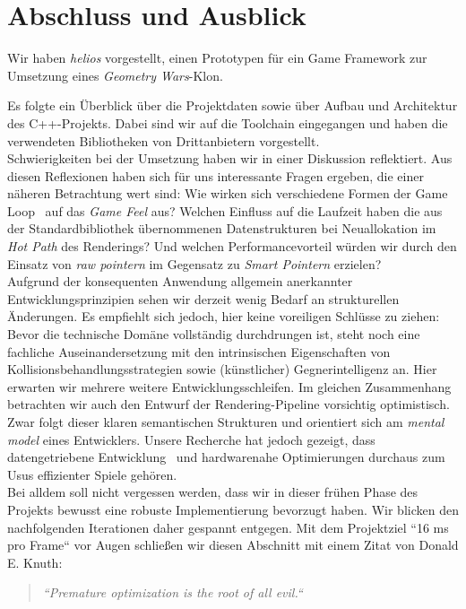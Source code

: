 \section{Abschluss und Ausblick}

Wir haben \textit{helios} vorgestellt, einen Prototypen für ein Game Framework zur Umsetzung eines \textit{Geometry Wars}-Klon.

Es folgte ein Überblick über die Projektdaten sowie über Aufbau und Architektur des C++-Projekts.
Dabei sind wir auf die Toolchain eingegangen und haben die verwendeten Bibliotheken von Drittanbietern vorgestellt.\\

Schwierigkeiten bei der Umsetzung haben wir in einer Diskussion reflektiert.
Aus diesen Reflexionen haben sich für uns interessante Fragen ergeben, die einer näheren Betrachtung wert sind:
Wie wirken sich verschiedene Formen der Game Loop~\cite[534 ff.]{Gre19} auf das \textit{Game Feel} aus?
Welchen Einfluss auf die Laufzeit haben die aus der Standardbibliothek übernommenen Datenstrukturen bei Neuallokation im \textit{Hot Path} des Renderings?
Und welchen Performancevorteil würden wir durch den Einsatz von \textit{raw pointern} im Gegensatz zu \textit{Smart Pointern} erzielen?\\

Aufgrund der konsequenten Anwendung allgemein anerkannter Entwicklungsprinzipien sehen wir derzeit wenig Bedarf an strukturellen Änderungen.
Es empfiehlt sich jedoch, hier keine voreiligen Schlüsse zu ziehen:
Bevor die technische Domäne vollständig durchdrungen ist, steht noch eine fachliche Auseinandersetzung mit den intrinsischen Eigenschaften von Kollisionsbehandlungsstrategien sowie (künstlicher) Gegnerintelligenz an.
Hier erwarten wir mehrere weitere Entwicklungsschleifen.
Im gleichen Zusammenhang betrachten wir auch den Entwurf der Rendering-Pipeline vorsichtig optimistisch.
Zwar folgt dieser klaren semantischen Strukturen und orientiert sich am \textit{mental model} eines Entwicklers.
Unsere Recherche hat jedoch gezeigt, dass datengetriebene Entwicklung~\cite{Bay22} und hardwarenahe Optimierungen durchaus zum Usus effizienter Spiele gehören.\\

Bei alldem soll nicht vergessen werden, dass wir in dieser frühen Phase des Projekts bewusst eine robuste Implementierung bevorzugt haben.
Wir blicken den nachfolgenden Iterationen daher gespannt entgegen.
Mit dem Projektziel ``16 ms pro Frame`` vor Augen schließen wir diesen Abschnitt mit einem Zitat von Donald E. Knuth:
\begin{quote}
    \centering
    \textit{``Premature optimization is the root of all evil.``}~\cite{Knu74}
\end{quote}

